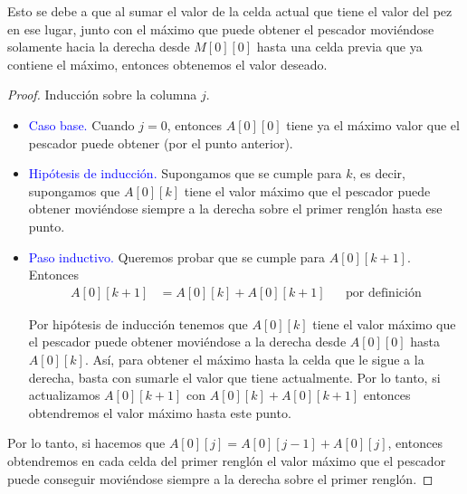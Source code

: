 \documentclass[letterpaper,11pt]{article}
\begin{document}
\begin{enumerate}
\begin{itemize}
        Esto se debe a que al sumar el valor de la celda actual que tiene el 
        valor del pez en ese lugar, junto con el máximo que puede obtener el 
        pescador moviéndose solamente hacia la derecha desde $M[0][0]$ hasta 
        una celda previa que ya contiene el máximo, entonces obtenemos el 
        valor deseado. 

        \begin{proof}
            Inducción sobre la columna $j$.
            \begin{itemize}
                \item \textcolor{blue}{Caso base.} Cuando $j = 0$, entonces 
                $A[0][0]$ tiene ya el máximo valor que el pescador puede 
                obtener (por el punto anterior).

                \item \textcolor{blue}{Hipótesis de inducción.} Supongamos que 
                se cumple para $k$, es decir, supongamos que $A[0][k]$ tiene el 
                valor máximo que el pescador puede obtener moviéndose siempre a 
                la derecha sobre el primer renglón hasta ese punto.  

                \item \textcolor{blue}{Paso inductivo.} Queremos probar que se 
                cumple para $A[0][k+1]$. Entonces 
                \begin{align*}
                    A[0][k+1]
                     &= A[0][k] + A[0][k+1] 
                     && \text{por definición}
                \end{align*}

                Por hipótesis de inducción tenemos que $A[0][k]$ tiene el 
                valor máximo que el pescador puede obtener moviéndose a la 
                derecha desde $A[0][0]$ hasta $A[0][k]$. Así, para obtener el 
                máximo hasta la celda que le sigue a la derecha, basta con 
                sumarle el valor que tiene actualmente. Por lo tanto, si 
                actualizamos $A[0][k+1]$ con $A[0][k] + A[0][k+1]$ entonces 
                obtendremos el valor máximo hasta este punto.
            \end{itemize}

            Por lo tanto, si hacemos que $A[0][j] = A[0][j-1] + A[0][j]$, 
            entonces obtendremos en cada celda del primer renglón el valor 
            máximo que el pescador puede conseguir moviéndose siempre a la 
            derecha sobre el primer renglón. 


\end{proof}
\end{itemize}
\end{enumerate}
\end{document}
